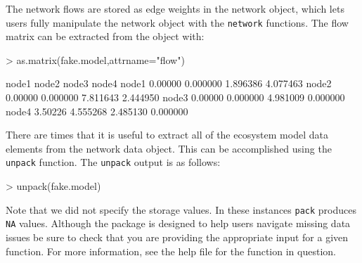 \documentclass[article]{jss}
\begin{document}
The network flows are stored as edge weights in the network object,
which lets users fully manipulate the network object with the
\texttt{network} functions.  The flow matrix can be extracted from the
object with:

\begin{Schunk}
\begin{Sinput}
> as.matrix(fake.model,attrname="flow")
\end{Sinput}
\begin{Soutput}
        node1    node2    node3    node4
node1 0.00000 0.000000 1.896386 4.077463
node2 0.00000 0.000000 7.811643 2.444950
node3 0.00000 0.000000 4.981009 0.000000
node4 3.50226 4.555268 2.485130 0.000000
\end{Soutput}
\end{Schunk}

There are times that it is useful to extract all of the ecosystem
model data elements from the network data object.  This can be
accomplished using the \texttt{unpack} function. The \texttt{unpack}
output is as follows:

\begin{Schunk}
\begin{Sinput}
> unpack(fake.model)
\end{Sinput}
\end{Schunk}

Note that we did not specify the storage values. In these instances
\texttt{pack} produces \texttt{NA} values. Although the package is
designed to help users navigate missing data issues be sure to check
that you are providing the appropriate input for a given function. For
more information, see the help file for the function in question.


\end{document}
